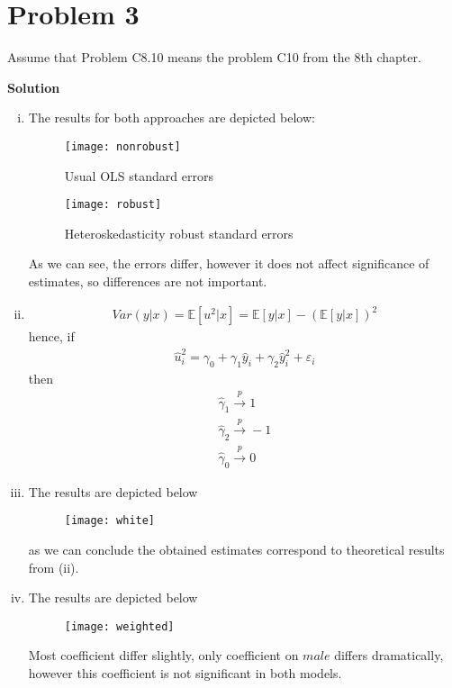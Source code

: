 \documentclass[a4paper]{article}
\newcommand{\expect}{\mathbb{E}}
\begin{document}
\section*{Problem 3}
Assume that Problem C8.10 means the problem C10 from the 8th chapter.

\textbf{Solution}

\begin{enumerate}[(i)]
	\item The results for both approaches are depicted below:
	\begin{figure}[H]
		\centering
		\texttt{[image: nonrobust]}
		\caption{Usual OLS standard errors}\label{fig1}
	\end{figure}
\begin{figure}[H]
	\centering
	\texttt{[image: robust]}
	\caption{Heteroskedasticity robust standard errors}\label{fig2}
\end{figure}
As we can see, the errors differ, however it does not affect significance of estimates, so differences are not important.
\item 
\begin{align*}
Var(y|x) = \expect[u^2|x] = \expect[y|x] - (\expect[y|x])^2
\end{align*}
hence, if
\begin{align*}
\hat{u}_i^2 = \gamma_0 + \gamma_1 \hat{y}_i + \gamma_2 \hat{y}_i^2 + \varepsilon_i
\end{align*}
then
\begin{align*}
\hat{\gamma}_1 \overset{p}{\to} 1\\
\hat{\gamma}_2 \overset{p}{\to} -1\\
\hat{\gamma}_0 \overset{p}{\to} 0
\end{align*}
\item The results are depicted below
\begin{figure}[H]
	\centering
	\texttt{[image: white]}
	\caption{}\label{fig3}
\end{figure}
as we can conclude the obtained estimates correspond to theoretical results from (ii).
\item The results are depicted below
\begin{figure}[H]
	\centering
	\texttt{[image: weighted]}
	\caption{}\label{fig4}
\end{figure}
Most coefficient differ slightly, only coefficient on $male$ differs dramatically, however this coefficient is not significant in both models.
\end{enumerate}
\end{document}
